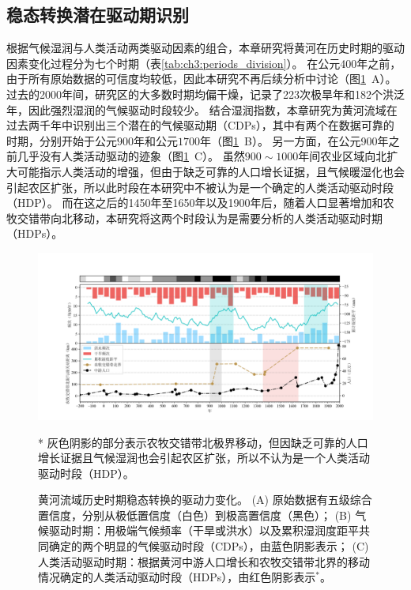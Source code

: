 
\subsection{稳态转换潜在驱动期识别}

根据气候湿润与人类活动两类驱动因素的组合，本章研究将黄河在历史时期的驱动因素变化过程分为七个时期（表\ref{tab:ch3:periods_division}）。
在公元400年之前，由于所有原始数据的可信度均较低，因此本研究不再后续分析中讨论（图\ref{fig:ch3:drivers}~A）。
过去的2000年间，研究区的大多数时期均偏干燥，记录了223次极旱年和182个洪泛年，因此强烈湿润的气候驱动时段较少。
结合湿润指数，本章研究为黄河流域在过去两千年中识别出三个潜在的气候驱动期（CDPs），其中有两个在数据可靠的时期，分别开始于公元$900$年和公元$1700$年（图\ref{fig:ch3:drivers}~B）。
另一方面，在公元900年之前几乎没有人类活动驱动的迹象（图\ref{fig:ch3:drivers}~C）。
虽然$900\sim1000$年间农业区域向北扩大可能指示人类活动的增强，但由于缺乏可靠的人口增长证据，且气候暖湿化也会引起农区扩张，所以此时段在本研究中不被认为是一个确定的人类活动驱动时段（HDP）。
而在这之后的1450年至1650年以及1900年后，随着人口显著增加和农牧交错带向北移动，本研究将这两个时段认为是需要分析的人类活动驱动时期（HDPs）。



\begin{figure}[htb]
    \includegraphics[width=\textwidth]{img/ch3/ch3_drivers.png}
    \caption[黄河流域历史时期稳态转换的驱动力变化]{黄河流域历史时期稳态转换的驱动力变化。
    (A) 原始数据有五级综合置信度，分别从极低置信度（白色）到极高置信度（黑色）；
    (B) 气候驱动时期：用极端气候频率（干旱或洪水）以及累积湿润度距平共同确定的两个明显的气候驱动时段（CDPs），由蓝色阴影表示；
    (C) 人类活动驱动时期：根据黄河中游人口增长和农牧交错带北界的移动情况确定的人类活动驱动时段（HDPs），由红色阴影表示$^*$。}
    \footnotesize
    * 灰色阴影的部分表示农牧交错带北极界移动，但因缺乏可靠的人口增长证据且气候湿润也会引起农区扩张，所以不认为是一个人类活动驱动时段（HDP）。\label{fig:ch3:drivers}
\end{figure}

